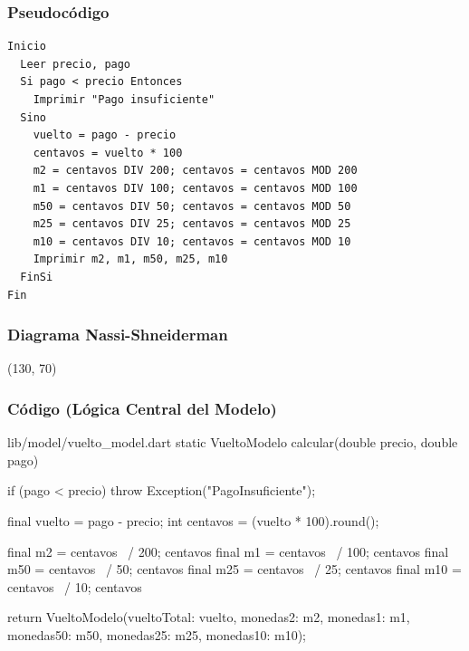 \documentclass[12pt, a4paper]{article}
\begin{document}
\subsubsection{Pseudocódigo}
\begin{verbatim}
Inicio
  Leer precio, pago
  Si pago < precio Entonces
    Imprimir "Pago insuficiente"
  Sino
    vuelto = pago - precio
    centavos = vuelto * 100
    m2 = centavos DIV 200; centavos = centavos MOD 200
    m1 = centavos DIV 100; centavos = centavos MOD 100
    m50 = centavos DIV 50; centavos = centavos MOD 50
    m25 = centavos DIV 25; centavos = centavos MOD 25
    m10 = centavos DIV 10; centavos = centavos MOD 10
    Imprimir m2, m1, m50, m25, m10
  FinSi
Fin
\end{verbatim}

\subsubsection{Diagrama Nassi-Shneiderman}
\begin{center}
\begin{struktogramm}(130, 70)
  \change
  \ifend
\end{struktogramm}
\end{center}

\subsubsection{Código (Lógica Central del Modelo)}
\begin{maccode}{lib/model/vuelto\_model.dart}
  static VueltoModelo calcular(double precio, double pago) {
    if (pago < precio) throw Exception("PagoInsuficiente");

    final vuelto = pago - precio;
    int centavos = (vuelto * 100).round();

    final m2 = centavos ~/ 200; centavos %
    final m1 = centavos ~/ 100; centavos %
    final m50 = centavos ~/ 50; centavos %
    final m25 = centavos ~/ 25; centavos %
    final m10 = centavos ~/ 10; centavos %

    return VueltoModelo(vueltoTotal: vuelto, monedas2: m2, 
                        monedas1: m1, monedas50: m50, 
                        monedas25: m25, monedas10: m10);
  }
\end{maccode}
\end{document}
